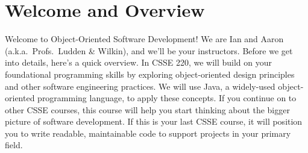 \section*{Welcome and Overview}
Welcome to Object-Oriented Software Development! 
We are Ian and Aaron (a.k.a.\ Profs.\ Ludden \& Wilkin), and 
we'll be your instructors. 
Before we get into details, 
here's a quick overview. 
In CSSE 220, 
we will build on your foundational programming skills  
by exploring object-oriented design principles 
and other software engineering practices. 
We will use Java, 
a widely-used object-oriented programming language, 
to apply these concepts. 
If you continue on to other CSSE courses, 
this course will help you start thinking about 
the bigger picture of software development. 
If this is your last CSSE course, 
it will position you to write readable, maintainable code 
to support projects in your primary field. 

